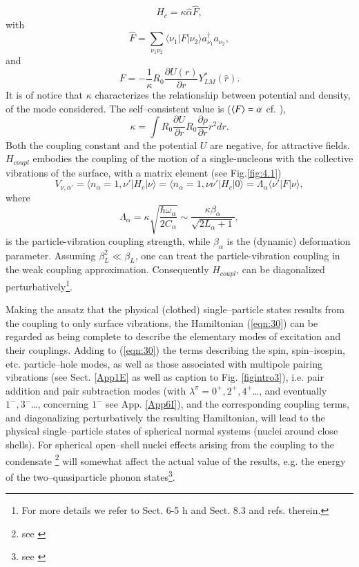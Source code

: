 \begin{equation}\label{eqintroD2}
H_{c} = \kappa \hat{\alpha} \hat{F} ,
\end{equation}
with
\begin{equation}
\hat{F} = \sum_{\nu_1 \nu_2} \langle \nu_1|F|\nu_2 \rangle a_{\nu_1}^{\dagger} a_{\nu_2} ,
\label{eqn:32}
\end{equation}
and
\begin{equation}
F = - \frac{1}{\kappa} R_0 \frac{\partial U(r)}{\partial r} Y_{LM}^* (\hat{r}) .
\label{eqn:33}
\end{equation}
It is of notice that $\kappa$ characterizes the relationship between potential and density, of the mode considered. The self--consistent value is ($\langle {F} \rangle=\alpha$ cf. \cite{Bohr:75}), 
\begin{equation}
\kappa=\int R_0\frac{\partial U}{\partial r}R_0\frac{\partial \rho}{\partial r}r^2dr.
\end{equation}
Both the coupling constant and the potential $U$ are negative, for attractive fields.
 $H_{coupl}$ embodies the coupling of the motion of a single-nucleons with the collective vibrations of the surface, with a matrix element (see Fig.\ref{fig:4.1})
\begin{equation}
V_{\nu,\alpha'}=\langle n_{\alpha} = 1, \nu' |H_{c}|\nu \rangle  = \langle n_{\alpha}=1, \nu\nu'|H_{c}|0 \rangle= \Lambda_{\alpha} \langle \nu' |F|\nu \rangle ,
\label{eqn:34}
\end{equation}
where
\begin{equation}\label{eqintroD6}
\Lambda_{\alpha} = \kappa \sqrt{\frac{\hbar\omega_{\alpha}}{2C_{\alpha}}} \sim \frac{\kappa \beta_{\alpha}}{\sqrt{2L_{\alpha}+1}} ,
\end{equation}
is the particle-vibration coupling strength, while $\beta_\alpha$ is the (dynamic) deformation parameter. Assuming $\beta_L^2 \ll \beta_L$, one can  treat the particle-vibration coupling in the weak coupling approximation. Consequently $H_{coupl}$, can be diagonalized perturbatively\footnote{For more details we refer to \cite{Bohr:75} Sect. 6-5 h and \cite{Brink:05} Sect. 8.3 and refs. therein.}.

Making the ansatz that the physical (clothed) single--particle states results from the coupling to only surface vibrations, the Hamiltonian (\ref{eqn:30}) can be regarded as being complete to describe the elementary modes of excitation and their couplings. Adding to (\ref{eqn:30}) the terms describing the spin, spin--isospin, etc. particle--hole modes, as well as those associated with multipole pairing vibrations (see Sect. \ref{App1E} as well as caption to Fig. \ref{figintro3}), i.e. pair addition and pair subtraction modes (with $\lambda^\pi=0^+,2^+,4^+$\dots, and eventually $1^-,3^-$\dots, concerning $1^-$ see App. \ref{App6I}), and the corresponding coupling terms, and diagonalizing perturbatively the resulting Hamiltonian, will lead to the physical single--particle states of spherical normal systems (nuclei around close shells). For spherical open--shell nuclei effects arising from the coupling to the condensate \footnote{see \cite{Bes:90}} will somewhat  affect the actual value of the results, e.g. the energy of the two--quasiparticle phonon states\footnote{see \cite{Barranco:04}}.  
